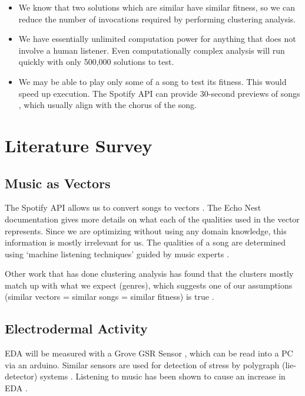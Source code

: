 \documentclass{article}
\begin{document}
	\begin{itemize}
		\item We know that two solutions which are similar have similar fitness, so we can reduce the number of invocations required by performing clustering analysis.
		\item We have essentially unlimited computation power for anything that does not involve a human listener. Even computationally complex analysis will run quickly with only 500,000 solutions to test.
		\item We may be able to play only some of a song to test its fitness. This would speed up execution. The Spotify API can provide 30-second previews of songs \cite{spotify_get_nodate-1}, which usually align with the chorus of the song.
	\end{itemize}

	\section{Literature Survey}
	
	\subsection{Music as Vectors}
	The Spotify API allows us to convert songs to vectors \cite{spotify_get_nodate}. The Echo Nest documentation gives more details on what each of the qualities used in the vector represents. Since we are optimizing without using any domain knowledge, this information is mostly irrelevant for us. The qualities of a song are determined using `machine listening techniques' guided by music experts \cite{jehan_analyzer_nodate}.
	
	Other work that has done clustering analysis has found that the clusters mostly match up with what we expect (genres), which suggests one of our assumptions (similar vectors = similar songs = similar fitness) is true \cite{santos_discovering_2017, rcharlie_analytics_coachellar_2017}.
	
	\subsection{Electrodermal Activity}
	EDA will be measured with a Grove GSR Sensor \cite{seeedstudio_grove_nodate}, which can be read into a PC via an arduino. Similar sensors are used for detection of stress by polygraph (lie-detector) systems \cite{tuckett_detection_1986}. Listening to music has been shown to cause an increase in EDA \cite{rickard_intense_2004, dillman-capentier_effects_2007, thoma_effect_2013}.
	
\end{document}
